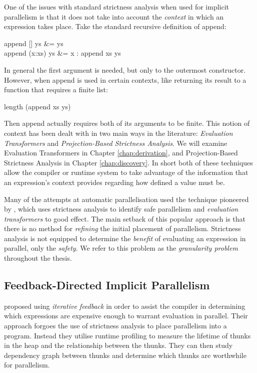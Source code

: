 One of the issues with standard strictness analysis when used for implicit
parallelism is that it does not take into account the \emph{context} in which
an expression takes place. Take the standard recursive definition of
\<append\>:

\begin{haskell}
append [] ys &= ys \\
append (x:xs) ys &= x : append xs ys
\end{haskell}

In general the first argument is needed, but only to the outermost constructor.
However, when \<append\> is used in certain contexts, like returning its result
to a function that requires a finite list:

\begin{haskell}
length (append xs ys)
\end{haskell}

Then \<append\> actually requires both of its arguments to be finite. This
notion of context has been dealt with in two main ways in the literature:
\emph{Evaluation Transformers} and \emph{Projection-Based Strictness Analysis}.
We will examine Evaluation Transformers in Chapter \ref{chap:derivation}, and
Projection-Based Strictness Analysis in Chapter \ref{chap:discovery}. In short
both of these techniques allow the compiler or runtime system to take advantage
of the information that an expression's context provides regarding how defined
a value must be.

Many of the attempts at automatic parallelisation used the technique pioneered
by \citet{hogen1992automatic}, which uses strictness analysis to identify safe
parallelism and \emph{evaluation transformers} \citep{burn1987evaluation} to
good effect. The main setback of this popular approach is that there is no
method for \emph{refining} the initial placement of parallelism. Strictness
analysis is not equipped to determine the \emph{benefit} of evaluating an
expression in parallel, only the \emph{safety}. We refer to this problem as the
\emph{granularity problem} throughout the thesis.


\subsection*{Feedback-Directed Implicit Parallelism}

\citet{feedbackImplicit} proposed using \emph{iterative feedback} in order to
assist the compiler in determining which expressions are expensive enough to
warrant evaluation in parallel. Their approach forgoes the use of strictness
analysis to place parallelism into a program. Instead they utilise runtime
profiling to measure the lifetime of thunks in the heap and the relationship
between the thunks. They can then study dependency graph between thunks
and determine which thunks are worthwhile for parallelism.

